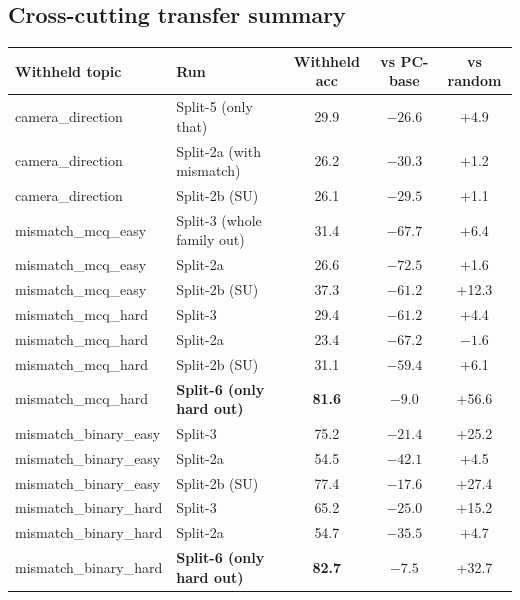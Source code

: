 \documentclass[11pt]{article}
\newcommand{\good}[1]{\textcolor{good}{\textbf{#1}}}
\newcommand{\bad}[1]{\textcolor{bad}{\textbf{#1}}}
\begin{document}
\subsection*{Cross-cutting transfer summary}

\begin{table}[h]\centering\small
\setlength{\tabcolsep}{4pt}
\begin{tabular}{l l c c c}
\toprule
\textbf{Withheld topic} & \textbf{Run} & \textbf{Withheld acc} & \textbf{vs PC-base} & \textbf{vs random} \\
\midrule
camera\_direction       & Split-5 (only that)         & 29.9 & \bad{$-26.6$} & +4.9 \\
camera\_direction       & Split-2a (with mismatch)    & 26.2 & \bad{$-30.3$} & +1.2 \\
camera\_direction       & Split-2b (SU)               & 26.1 & \bad{$-29.5$} & +1.1 \\
\midrule
mismatch\_mcq\_easy     & Split-3 (whole family out)  & 31.4 & \bad{$-67.7$} & +6.4 \\
mismatch\_mcq\_easy     & Split-2a                    & 26.6 & \bad{$-72.5$} & +1.6 \\
mismatch\_mcq\_easy     & Split-2b (SU)               & 37.3 & \bad{$-61.2$} & +12.3 \\
\midrule
mismatch\_mcq\_hard     & Split-3                     & 29.4 & \bad{$-61.2$} & +4.4 \\
mismatch\_mcq\_hard     & Split-2a                    & 23.4 & \bad{$-67.2$} & $-1.6$ \\
mismatch\_mcq\_hard     & Split-2b (SU)               & 31.1 & \bad{$-59.4$} & +6.1 \\
mismatch\_mcq\_hard     & \textbf{Split-6 (only hard out)} & \good{81.6} & \good{$-9.0$} & +56.6 \\
\midrule
mismatch\_binary\_easy  & Split-3                     & 75.2 & \bad{$-21.4$} & +25.2 \\
mismatch\_binary\_easy  & Split-2a                    & 54.5 & \bad{$-42.1$} & +4.5 \\
mismatch\_binary\_easy  & Split-2b (SU)               & 77.4 & \bad{$-17.6$} & +27.4 \\
\midrule
mismatch\_binary\_hard  & Split-3                     & 65.2 & \bad{$-25.0$} & +15.2 \\
mismatch\_binary\_hard  & Split-2a                    & 54.7 & \bad{$-35.5$} & +4.7 \\
mismatch\_binary\_hard  & \textbf{Split-6 (only hard out)} & \good{82.7} & \good{$-7.5$} & +32.7 \\

\end{tabular}
\end{table}
\end{document}
